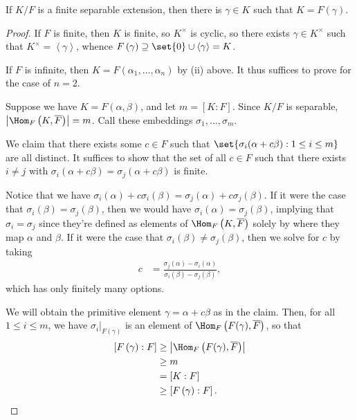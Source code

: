 \documentclass[10pt]{mypackage}
\begin{document}
\begin{theorem}
  If $K/F$ is a finite separable extension, then there is $\gamma\in K$ such that $K = F\left( \gamma \right)$.
\end{theorem}
\begin{proof}
  If $F$ is finite, then $K$ is finite, so $K^{\times}$ is cyclic, so there exists $\gamma\in K^{\times}$ such that $K^{\times} = \left\langle \gamma \right\rangle$, whence $F\left( \gamma \right)\supseteq \set{0}\cup \left\langle \gamma \right\rangle = K$.

  If $F$ is infinite, then $K = F\left( \alpha_1,\dots,\alpha_n \right)$ by (ii) above. It thus suffices to prove for the case of $n = 2$.

  Suppose we have $K = F\left( \alpha,\beta \right)$, and let $m = \left[ K:F \right]$. Since $K/F$ is separable, $\left\vert \Hom_F\left( K, \overline{F} \right)  \right\vert = m$. Call these embeddings $\sigma_1,\dots,\sigma_m$.

  We claim that there exists some $c\in F$ such that $\set{\sigma_i(\alpha + c\beta) : 1\leq i \leq m}$ are all distinct. It suffices to show that the set of all $c\in F$ such that there exists $i\neq j$ with $\sigma_i\left( \alpha + c\beta \right) = \sigma_j\left( \alpha + c\beta \right)$ is finite.

  Notice that we have $\sigma_i(\alpha) + c\sigma_i(\beta) = \sigma_j(\alpha) + c\sigma_j(\beta)$. If it were the case that $\sigma_i(\beta) = \sigma_j(\beta)$, then we would have $\sigma_i(\alpha) = \sigma_j(\beta)$, implying that $\sigma_i = \sigma_j$ since they're defined as elements of $\Hom_F\left(K, \overline{F}\right)$ solely by where they map $\alpha$ and $\beta$. If it were the case that $\sigma_i(\beta)\neq \sigma_j(\beta)$, then we solve for $c$ by taking
  \begin{align*}
    c &= \frac{\sigma_j(\alpha) - \sigma_i(\alpha)}{\sigma_i(\beta) - \sigma_j(\beta)},
  \end{align*}
  which has only finitely many options.

  We will obtain the primitive element $\gamma = \alpha + c\beta$ as in the claim. Then, for all $1\leq i \leq m$, we have $\sigma_i|_{F(\gamma)}$ is an element of $\Hom_F\left( F(\gamma), \overline{F} \right)$, so that
  \begin{align*}
    \left[ F\left( \gamma \right):F \right] &\geq \left\vert \Hom_F\left( F(\gamma), \overline{F} \right) \right\vert\\
                                            &\geq m\\
                                            &= \left[ K:F \right]\\
                                            &\geq \left[ F\left( \gamma \right):F \right].
  \end{align*}
\end{proof}
\end{document}
